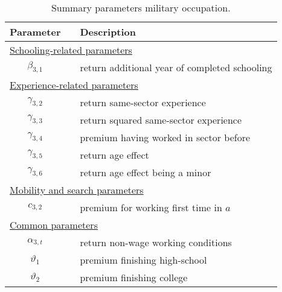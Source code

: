 
\begin{table}[hbt!]
\caption{Summary parameters military occupation.}
\label{tab:ParametersMilitaryOccupation}
\vspace{5pt}
\centering
\setlength\extrarowheight{2.5pt}
\begin{tabular}{@{}cll@{}}
\toprule
Parameter            &  &  \multicolumn{1}{l}{Description}              \\ \midrule
\multicolumn{3}{l}{\underline{Schooling-related parameters}}            \\[5pt]
$\beta_{3,1}$        &  & return additional year of completed schooling \\[7.5pt]
\multicolumn{3}{l}{\underline{Experience-related parameters}}           \\[5pt]
$\gamma_{3,2}$       &  & return same-sector experience                 \\
$\gamma_{3,3}$       &  & return squared same-sector experience         \\
$\gamma_{3,4}$       &  & premium having worked in sector before        \\
$\gamma_{3,5}$       &  & return age effect                             \\
$\gamma_{3,6}$       &  & return age effect being a minor               \\[7.5pt]
\multicolumn{3}{l}{\underline{Mobility and search parameters}}          \\[5pt]
$c_{3,2}$            &  & premium for working first time in $a$         \\[7.5pt]
\multicolumn{3}{l}{\underline{Common parameters}}                  \\[5pt]
$\alpha_{3,t}$        &  & return non-wage working conditions            \\
$\vartheta_1$        &  & premium finishing high-school                 \\
$\vartheta_2$        &  & premium finishing college                     \\[7.5pt]
\bottomrule
\end{tabular}
\end{table}
